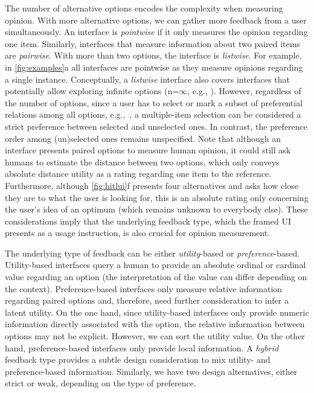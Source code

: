 \documentclass[acmsmall,screen,nonacm]{acmart}
\begin{document}
The number of alternative options encodes the complexity when measuring opinion. With more alternative options, we can gather more feedback from a user simultaneously. An interface is \emph{pointwise} if it only measures the opinion regarding one item.
%
Similarly, interfaces that measure information about two paired items are \emph{pairwise}. With more than two options, the interface is \emph{listwise}.
%
For example, in \autoref{fig:examples}a all interfaces are pointwise as they measure opinions regarding a single instance. Conceptually, a \emph{listwise} interface also covers interfaces that potentially allow exploring infinite options (n=$\infty$, e.g., \citet{koyama2017sequential}). However, regardless of the number of options, since a user has to select or mark a subset of preferential relations among all options, e.g.,~\citet{wilber2014cost}, a multiple-item selection can be considered a strict preference between selected and unselected ones. In contrast, the preference order among (un)selected ones remains unspecified. Note that although an interface presents paired options to measure human opinion, it could still ask humans to estimate the distance between two options, which only conveys absolute distance utility as a rating regarding one item to the reference. Furthermore, although \autoref{fig:hitlui}f presents four alternatives and asks how close they are to what the user is looking for, this is an absolute rating only concerning the user's idea of an optimum (which remains unknown to everybody else). These considerations imply that the underlying feedback type, which the framed UI presents as a usage instruction, is also crucial for opinion measurement.

The underlying type of feedback can be either \emph{utility}-based or \emph{preference}-based. Utility-based interfaces query a human to provide an absolute ordinal or cardinal value regarding an option (the interpretation of the value can differ depending on the context). Preference-based interfaces only measure relative information regarding paired options and, therefore, need further consideration to infer a latent utility.
%
On the one hand, since utility-based interfaces only provide numeric information directly associated with the option, the relative information between options may not be explicit. However, we can sort the utility value. On the other hand, preference-based interfaces only provide local information. A \emph{hybrid} feedback type provides a subtle design consideration to mix utility- and preference-based information. Similarly, we have two design alternatives, either strict or weak, depending on the type of preference.
\end{document}
